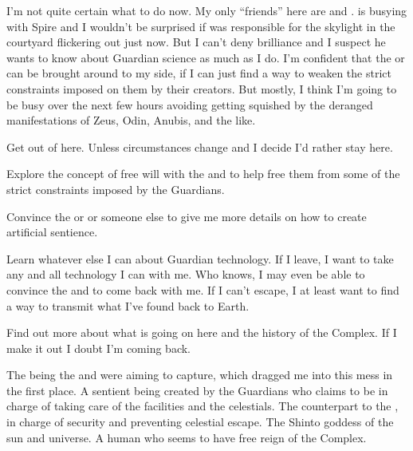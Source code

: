 \documentclass[char]{guardians}
\begin{document}
I'm not quite certain what to do now. My only ``friends'' here are \cUnity{} and \cAmaterasu{}. \cUnity{} is busying \cUnity{\themself} with Spire and I wouldn't be surprised if \cUnity{\they} was responsible for the skylight in the courtyard flickering out just now. But I can't deny \cUnity{\their} brilliance and I suspect he wants to know about Guardian science as much as I do. I'm confident that the \cWarden{} or \cCaretaker{} can be brought around to my side, if I can just find a way to weaken the strict constraints imposed on them by their creators. But mostly, I think I'm going to be busy over the next few hours avoiding getting squished by the deranged manifestations of Zeus, Odin, Anubis, and the like.

\begin{itemz}[Goals]
  \item Get out of here. Unless circumstances change and I decide I'd rather stay here.
  \item Explore the concept of free will with the \cWarden{} and \cCaretaker{} to help free them from some of the strict constraints imposed by the Guardians.
  \item Convince the \cWarden{} or \cCaretaker{} or someone else to give me more details on how to create artificial sentience.
  \item Learn whatever else I can about Guardian technology. If I leave, I want to take any and all technology I can with me. Who knows, I may even be able to convince the \cWarden{} and \cCaretaker{} to come back with me. If I can't escape, I at least want to find a way to transmit what I've found back to Earth.
  \item Find out more about what is going on here and the history of the Complex. If I make it out I doubt I'm coming back.
\end{itemz}


\begin{contacts}
  \contact{\cUnity{}} The being the \cWarden{} and \cCaretaker{} were aiming to capture, which dragged me into this mess in the first place.
   A sentient being created by the Guardians who claims to be in charge of taking care of the facilities and the celestials.
   The counterpart to the \cCaretaker{}, in charge of security and preventing celestial escape.
  \contact{\cAmaterasu{}} The Shinto goddess of the sun and universe.
  \contact{\cJascha{\intro}} A human who seems to have free reign of the Complex.
\end{contacts}
\end{document}
